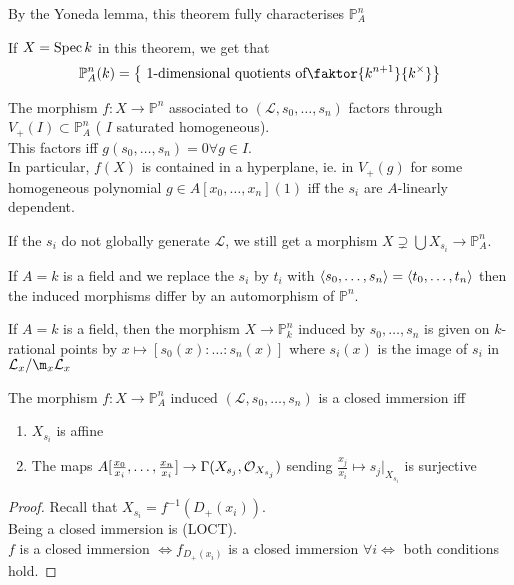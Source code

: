 \documentclass[../main.tex]{subfiles}
\begin{document}
\begin{rmq}
By the Yoneda lemma, this theorem fully characterises $ \mathbb{P}^{n}_A$ 
\end{rmq}
\begin{rmq}
If $X= \operatorname{Spec} k$ in this theorem, we get that 
\[ 
\mathbb{P}^{n}_A( k) = \left\{ \text{ 1-dimensional quotients of} \faktor{k^{n+1}}{k^{\times}} \right\} 
\]
\end{rmq}

\begin{rmq}
The morphism $f:X\to \mathbb{P}^{n}$ associated to $ ( \mathcal{L}, s_0,\ldots,s_n) $ factors through $V_+( I) \subset \mathbb{P}^{n}_A$ ( $I$ saturated homogeneous).\\
This factors iff $g( s_0,\ldots,s_n) =0 \forall g \in I$.\\
In particular, $f( X) $ is contained in a hyperplane, ie. in $V_+( g) $ for some homogeneous polynomial $g\in A[x_0,\ldots,x_n]( 1) $ iff the $s_i$ are $A$-linearly dependent.
\end{rmq}
\begin{rmq}
If the $s_i$ do not globally generate $ \mathcal{L}$, we still get a morphism $X\supsetneq \bigcup X_{s_i} \to \mathbb{P}^{n}_A$.
\end{rmq}
\begin{rmq}
	If $A=k$ is a field and we replace the $s_i$ by $t_i$ with $ \left\langle s_0,\ldots,s_n\right\rangle = \left\langle t_0,\ldots,t_n\right\rangle$ then the induced morphisms differ by an automorphism of $ \mathbb{P}^{n}$.
\end{rmq}
\begin{rmq}
If $A= k$ is a field, then the morphism $X\to \mathbb{P}^{n}_k$ induced by $s_0,\ldots,s_n$ is given on $k$-rational points by $x\mapsto [ s_0( x) :\ldots:s_n( x) ] $ where $s_i( x) $ is the image of $s_i$ in $ \mathcal{L}_x /\m_x \mathcal{L}_x$ 
\end{rmq}
\begin{propo}
The morphism $f:X\to \mathbb{P}^{n}_A$ induced $ ( \mathcal{L},s_0,\ldots,s_n) $ is a closed immersion iff
\begin{enumerate}
\item $X_{s_i} $ is affine
\item The maps $ A[\frac{x_0}{x_i},\ldots, \frac{x_n}{x_i}] \to\Gamma( X_{s_j} , \mathcal{O}_{X_{s_j} } ) $ sending $\frac{x_j }{x_i}\mapsto s_j |_{X_{s_i} } $  is surjective
\end{enumerate}
\end{propo}
\begin{proof}
Recall that $X_{s_i} = f^{-1}( D_+( x_i) ) $.\\
Being a closed immersion is (LOCT).\\
$f$ is a closed immersion $\iff f_{D_+( x_i) } $ is a closed immersion $\forall i\iff $ both conditions hold.
\end{proof}
\end{document}
